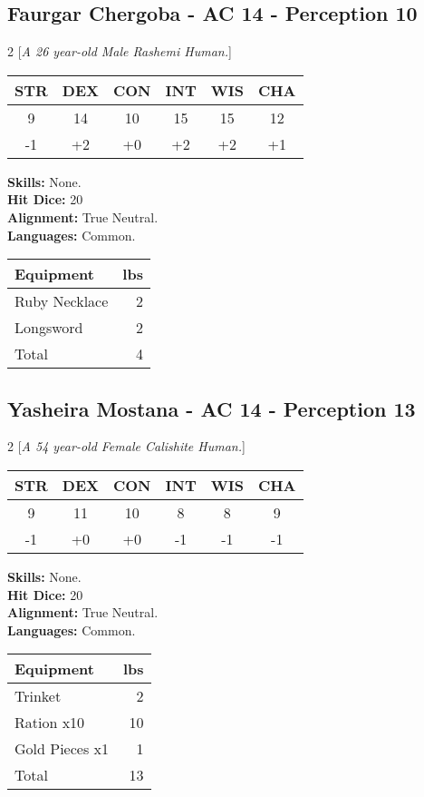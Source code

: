 \subsection*{Faurgar Chergoba - AC 14 - Perception 10}
\begin{multicols}{2}
[\textit{A 26 year-old Male Rashemi Human.}]
\begin{tabular}{cccccc}
 {STR}&
 {DEX}&
 {CON}&
 {INT}&
 {WIS}&
 {CHA}\\
\hline
9 & 14 & 10 & 15 & 15 & 12\\
-1 & +2 & +0 & +2 & +2 & +1
\end{tabular}
\textbf{Skills:} 
None.\\
\textbf{Hit Dice:} 20\\
\textbf{Alignment:} True Neutral.\\
\textbf{Languages:} 
Common.\\

\begin{tabular}{p{} r}
\textbf{Equipment} & lbs\\
\hline

Ruby Necklace & 2\\

Longsword & 2\\

\hline
Total & 4
\end{tabular}


\end{multicols}


\subsection*{Yasheira Mostana - AC 14 - Perception 13}
\begin{multicols}{2}
[\textit{A 54 year-old Female Calishite Human.}]
\begin{tabular}{cccccc}
 {STR}&
 {DEX}&
 {CON}&
 {INT}&
 {WIS}&
 {CHA}\\
\hline
9 & 11 & 10 & 8 & 8 & 9\\
-1 & +0 & +0 & -1 & -1 & -1
\end{tabular}
\textbf{Skills:} 
None.\\
\textbf{Hit Dice:} 20\\
\textbf{Alignment:} True Neutral.\\
\textbf{Languages:} 
Common.\\

\begin{tabular}{p{} r}
\textbf{Equipment} & lbs\\
\hline

Trinket & 2\\

Ration x10 & 10\\

Gold Pieces x1 & 1\\

\hline
Total & 13
\end{tabular}


\end{multicols}


